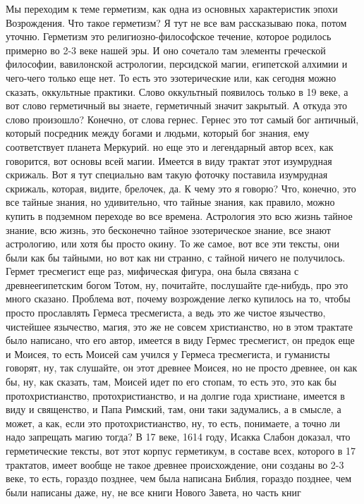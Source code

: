 Мы переходим к теме герметизм, как одна из основных
характеристик эпохи Возрождения. Что такое герметизм? Я тут не все вам
рассказываю пока, потом уточню. Герметизм это религиозно-философское течение,
которое родилось примерно во 2-3 веке нашей эры. И оно сочетало там элементы
греческой философии, вавилонской астрологии, персидской магии, египетской
алхимии и чего-чего только еще нет. То есть это эзотерические или, как сегодня
можно сказать, оккультные практики. Слово оккультный появилось только в 19 веке,
а вот слово герметичный вы знаете, герметичный значит закрытый. А откуда это
слово произошло? Конечно, от слова гернес. Гернес это тот самый бог античный,
который посредник между богами и людьми, который бог знания, ему соответствует
планета Меркурий. но еще это и легендарный автор всех, как говорится, вот основы
всей магии. Имеется в виду трактат этот изумрудная скрижаль. Вот я тут
специально вам такую фоточку поставила изумрудная скрижаль, которая, видите,
брелочек, да. К чему это я говорю? Что, конечно, это все тайные знания, но
удивительно, что тайные знания, как правило, можно купить в подземном переходе
во все времена. Астрология это всю жизнь тайное знание, всю жизнь, это
бесконечно тайное эзотерическое знание, все знают астрологию, или хотя бы просто
окину. То же самое, вот все эти тексты, они были как бы тайными, но вот как ни
странно, с тайной ничего не получилось. Гермет тресмегист еще раз, мифическая
фигура, она была связана с древнеегипетским богом Тотом, ну, почитайте,
послушайте где-нибудь, про это много сказано. Проблема вот, почему возрождение
легко купилось на то, чтобы просто прославлять Гермеса тресмегиста, а ведь это
же чистое язычество, чистейшее язычество, магия, это же не совсем христианство,
но в этом трактате было написано, что его автор, имеется в виду Гермес
тресмегист, он предок еще и Моисея, то есть Моисей сам учился у Гермеса
тресмегиста, и гуманисты говорят, ну, так слушайте, он этот древнее Моисея, но
не просто древнее, он как бы, ну, как сказать, там, Моисей идет по его стопам,
то есть это, это как бы протохристианство, протохристианство, и на долгие года
христиане, имеется в виду и священство, и Папа Римский, там, они таки
задумались, а в смысле, а может, а как, если это протохристианство, ну, то есть,
понимаете, а точно ли надо запрещать магию тогда? В 17 веке, 1614 году, Исакка
Слабон доказал, что герметические тексты, вот этот корпус герметикум, в составе
всех, которого в 17 трактатов, имеет вообще не такое древнее происхождение, они
созданы во 2-3 веке, то есть, гораздо позднее, чем была написана Библия, гораздо
позднее, чем были написаны даже, ну, не все книги Нового Завета, но часть книг
